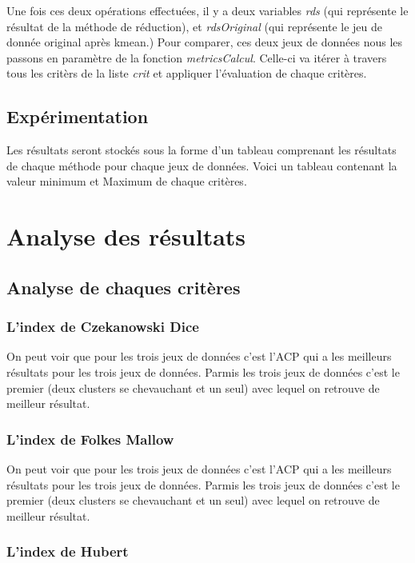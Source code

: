 Une fois ces deux opérations effectuées, il y a deux variables \textit{rds} (qui représente le résultat de la méthode de réduction), et \textit{rdsOriginal} (qui représente le jeu de
donnée original après kmean.) Pour comparer, ces deux jeux de données nous les passons en paramètre de la fonction \textit{metricsCalcul}.
Celle-ci va itérer à travers tous les critèrs de la liste \textit{crit} et appliquer l'évaluation de chaque critères.

\subsection{Expérimentation}
Les résultats seront stockés sous la forme d'un tableau comprenant les résultats de chaque méthode pour chaque jeux de données. 
Voici un tableau contenant la valeur minimum et Maximum de chaque critères.

\section{Analyse des résultats}

\subsection{Analyse de chaques critères}

\subsubsection{L'index de Czekanowski Dice}
On peut voir que pour les trois jeux de données c'est l'ACP qui a les meilleurs résultats pour les trois jeux de données.
Parmis les trois jeux de données c'est le premier (deux clusters se chevauchant et un seul) avec lequel on retrouve de meilleur résultat.

\subsubsection{L'index de Folkes Mallow}
On peut voir que pour les trois jeux de données c'est l'ACP qui a les meilleurs résultats pour les trois jeux de données.
Parmis les trois jeux de données c'est le premier (deux clusters se chevauchant et un seul) avec lequel on retrouve de meilleur résultat.

\subsubsection{L'index de Hubert}

